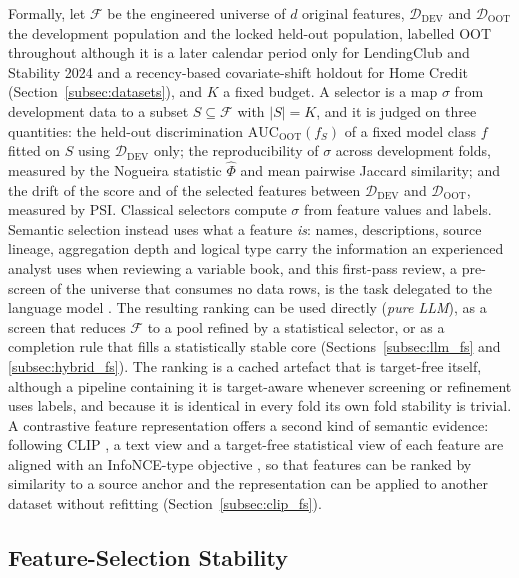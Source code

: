 \documentclass[final,5p,twocolumn]{elsarticle}
\newcommand{\Kfeat}{K}
\newcommand{\AUC}{\mathrm{AUC}}
\begin{document}
Formally, let $\mathcal{F}$ be the engineered universe of $d$ original features, $\mathcal{D}_{\mathrm{DEV}}$ and $\mathcal{D}_{\mathrm{OOT}}$ the development population and the locked held-out population, labelled OOT throughout although it is a later calendar period only for LendingClub and Stability 2024 and a recency-based covariate-shift holdout for Home Credit (Section~\ref{subsec:datasets}), and $\Kfeat$ a fixed budget. A selector is a map $\sigma$ from development data to a subset $S\subseteq\mathcal{F}$ with $|S|=\Kfeat$, and it is judged on three quantities: the held-out discrimination $\AUC_{\mathrm{OOT}}(f_S)$ of a fixed model class $f$ fitted on $S$ using $\mathcal{D}_{\mathrm{DEV}}$ only; the reproducibility of $\sigma$ across development folds, measured by the Nogueira statistic $\hat\Phi$ and mean pairwise Jaccard similarity; and the drift of the score and of the selected features between $\mathcal{D}_{\mathrm{DEV}}$ and $\mathcal{D}_{\mathrm{OOT}}$, measured by PSI. Classical selectors compute $\sigma$ from feature values and labels. Semantic selection instead uses what a feature \emph{is}: names, descriptions, source lineage, aggregation depth and logical type carry the information an experienced analyst uses when reviewing a variable book, and this first-pass review, a pre-screen of the universe that consumes no data rows, is the task delegated to the language model \cite{jeong2025,li2025sigkdd}. The resulting ranking can be used directly (\emph{pure LLM}), as a screen that reduces $\mathcal{F}$ to a pool refined by a statistical selector, or as a completion rule that fills a statistically stable core (Sections~\ref{subsec:llm_fs} and \ref{subsec:hybrid_fs}). The ranking is a cached artefact that is target-free itself, although a pipeline containing it is target-aware whenever screening or refinement uses labels, and because it is identical in every fold its own fold stability is trivial. A contrastive feature representation offers a second kind of semantic evidence: following CLIP \cite{radford2021}, a text view and a target-free statistical view of each feature are aligned with an InfoNCE-type objective \cite{oord2018}, so that features can be ranked by similarity to a source anchor and the representation can be applied to another dataset without refitting (Section~\ref{subsec:clip_fs}).

\subsection{Feature-Selection Stability}
\label{subsec:fs_stability_background}
\end{document}
